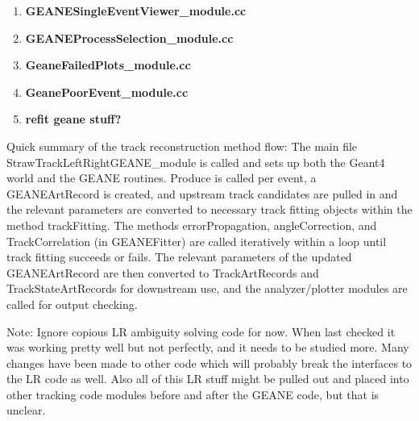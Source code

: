 \documentclass{article}
\begin{document}
\begin{enumerate}
      \item{\bf{GEANESingleEventViewer\_module.cc}} \\

      \item{\bf{GEANEProcessSelection\_module.cc}} \\

      \item{\bf{GeaneFailedPlots\_module.cc}} \\

      \item{\bf{GeanePoorEvent\_module.cc}} \\

      \item{\bf{refit geane stuff?}} \\

    \end{enumerate}


    Quick summary of the track reconstruction method flow: The main file StrawTrackLeftRightGEANE\_module is called and sets up both the Geant4 world and the GEANE routines. Produce is called per event, a GEANEArtRecord is created, and upstream track candidates are pulled in and the relevant parameters are converted to necessary track fitting objects within the method trackFitting. The methods errorPropagation, angleCorrection, and TrackCorrelation (in GEANEFitter) are called iteratively within a loop until track fitting succeeds or fails. The relevant parameters of the updated GEANEArtRecord are then converted to TrackArtRecords and TrackStateArtRecords for downstream use, and the analyzer/plotter modules are called for output checking.

    Note: Ignore copious LR ambiguity solving code for now. When last checked it was working pretty well but not perfectly, and it needs to be studied more. Many changes have been made to other code which will probably break the interfaces to the LR code as well. Also all of this LR stuff might be pulled out and placed into other tracking code modules before and after the GEANE code, but that is unclear.
\end{document}

